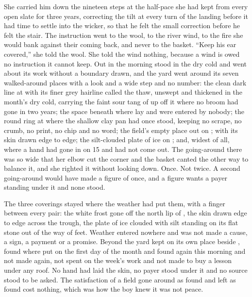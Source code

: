 She carried him down the nineteen steps at the half-pace she had kept from every open slate for three years, correcting the tilt at every turn of the landing before it had time to settle into the wicker, so that he felt the small correction before he felt the stair. The instruction went to the wool, to the river wind, to the fire she would bank against their coming back, and never to the basket. “Keep his ear covered,” she told the wool. She told the wind nothing, because a wind is owed no instruction it cannot keep. Out in  the morning stood in the dry cold and went about its work without a boundary drawn, and the yard went around its seven walked-around places with a look and a wide step and no number: the clean dark line at  with its finer grey hairline called the thaw, unswept and thickened in the month's dry cold, carrying the faint sour tang of  up off it where no broom had gone in two years; the space beneath  where  lay and were entered by nobody; the round ring at  where the shallow clay pan had once stood, keeping no scrape, no crumb, no print, no chip and no word; the field's empty place out on ;  with its skin drawn edge to edge; the silt-clouded plate of ice on ; and, widest of all,  where a hand had gone in on  15 and had not come out. The going-around there was so wide that her elbow cut the corner and the basket canted the other way to balance it, and she righted it without looking down. Once. Not twice. A second going-around would have made a figure of once, and a figure wants a payer standing under it and none stood.

The three coverings stayed where the weather had put them, with a finger between every pair: the white frost gone off the north lip of , the skin drawn edge to edge across the trough, the plate of ice clouded with silt standing on its flat stone out of the way of feet. Weather entered nowhere and was not made a cause, a sign, a payment or a promise. Beyond the yard  kept  on its own place beside , found where put on the first day of the month and found again this morning and not made again, not spent on the week's work and not made to buy a lesson under any roof. No hand had laid the skin, no payer stood under it and no source stood to be asked. The satisfaction of a field gone around as found and left as found cost nothing, which was how the boy knew it was not peace.

